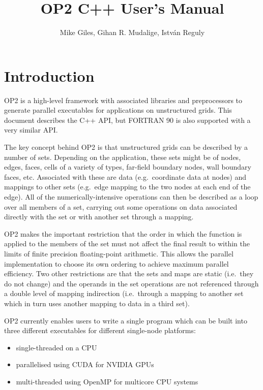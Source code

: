 \documentclass[11pt]{article}
\begin{document}
\title{OP2 C++ User's Manual}
\author{Mike Giles, Gihan R. Mudalige, Istv{\'a}n Reguly}
\maketitle

\newpage




\tableofcontents

\newpage

\newpage
\section{Introduction}

OP2 is a high-level framework with associated libraries and
preprocessors to generate parallel executables for applications
on unstructured grids.  This document describes the C++ API,
but FORTRAN 90 is also supported with a very similar API.

The key concept behind OP2 is that unstructured grids can be
described by a number of sets.  Depending on the application,
these sets might be of nodes, edges, faces, cells of a variety
of types, far-field boundary nodes, wall boundary faces, etc.
Associated with these are data (e.g.~coordinate data at nodes)
and mappings to other sets (e.g.~edge mapping to the two nodes
at each end of the edge).  All of the numerically-intensive
operations can then be described as a loop over all members of
a set, carrying out some operations on data associated directly
with the set or with another set through a mapping.

OP2 makes the important restriction that the order in which the
function is applied to the members of the set must not affect the
final result to within the limits of finite precision floating-point arithmetic.
This allows the parallel implementation to choose
its own ordering to achieve maximum parallel efficiency.
Two other restrictions are that the sets and maps are static
(i.e.~they do not change) and the operands in the set operations
are not referenced through a double level of mapping indirection
(i.e.~through a mapping to another set which in turn uses another
mapping to data in a third set).

OP2 currently enables users to write a single program which can be
built into three different executables for different single-node
platforms:
\begin{itemize}
\item
single-threaded on a CPU
\item
parallelised using CUDA for NVIDIA GPUs
\item
multi-threaded using OpenMP for multicore CPU systems
\end{itemize}
\end{document}
